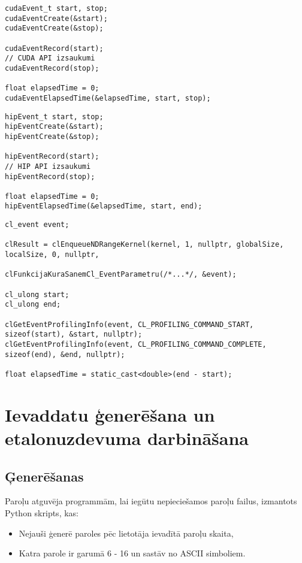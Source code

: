\begin{lstlisting}[caption={CUDA laika mērīšanas piemērs},
    label=lst:cuda_example]
cudaEvent_t start, stop;
cudaEventCreate(&start);
cudaEventCreate(&stop);

cudaEventRecord(start);
// CUDA API izsaukumi
cudaEventRecord(stop);

float elapsedTime = 0;
cudaEventElapsedTime(&elapsedTime, start, stop);
\end{lstlisting}

\begin{lstlisting}[caption={ROCm HIP laika mērīšanas piemērs},
    label=lst:hip_example]
hipEvent_t start, stop;
hipEventCreate(&start);
hipEventCreate(&stop);

hipEventRecord(start);
// HIP API izsaukumi
hipEventRecord(stop);

float elapsedTime = 0;
hipEventElapsedTime(&elapsedTime, start, end);
\end{lstlisting}

\begin{lstlisting}[caption={OpenCL laika mērīšanas piemērs},
    label=lst:cl_example]
cl_event event;

clResult = clEnqueueNDRangeKernel(kernel, 1, nullptr, globalSize, localSize, 0, nullptr,

clFunkcijaKuraSanemCl_EventParametru(/*...*/, &event);

cl_ulong start;
cl_ulong end;

clGetEventProfilingInfo(event, CL_PROFILING_COMMAND_START, sizeof(start), &start, nullptr);
clGetEventProfilingInfo(event, CL_PROFILING_COMMAND_COMPLETE, sizeof(end), &end, nullptr);

float elapsedTime = static_cast<double>(end - start);
\end{lstlisting}

\section{Ievaddatu ģenerēšana un etalonuzdevuma darbināšana}
\subsection{Ģenerēšanas}
Paroļu atguvēja programmām, lai iegūtu nepieciešamos paroļu failus, izmantots
Python skripts\cite{kursa-darbs}, kas:
\begin{itemize}
    \item Nejauši ģenerē paroles pēc lietotāja ievadītā paroļu skaita,
    \item Katra parole ir garumā 6 - 16 un sastāv no ASCII simboliem.
\end{itemize}


